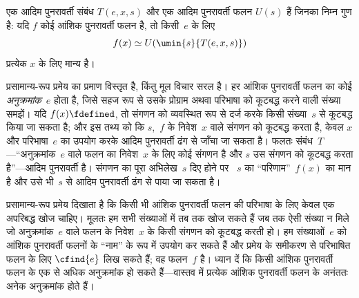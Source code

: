 \documentclass[../../../include/open-logic-section]{subfiles}
\begin{document}

\begin{thm}[क्लिनी (Kleene) का प्रसामान्य-रूप प्रमेय]
एक आदिम पुनरावर्ती संबंध $T(e, x, s)$ और एक आदिम पुनरावर्ती फलन $U(s)$
हैं जिनका निम्न गुण है: यदि $f$ कोई आंशिक पुनरावर्ती फलन है, तो किसी~$e$
के लिए
\[
f(x) \simeq U(\umin{s}{T(e, x, s)})
\]
प्रत्येक $x$ के लिए मान्य है।
\end{thm}

\begin{explain}
प्रसामान्य-रूप प्रमेय का प्रमाण विस्तृत है, किंतु मूल विचार सरल है। हर
आंशिक पुनरावर्ती फलन का कोई \emph{अनुक्रमांक}~$e$ होता है, जिसे सहज रूप
से उसके प्रोग्राम अथवा परिभाषा को कूटबद्ध करने वाली संख्या समझें। यदि
$f(x)
\fdefined$, तो संगणन को व्यवस्थित रूप से दर्ज करके किसी संख्या~$s$
से कूटबद्ध किया जा सकता है; और इस तथ्य को कि $s$,~$f$ के निवेश~$x$ वाले
संगणन को कूटबद्ध करता है, केवल $x$ और परिभाषा~$e$ का उपयोग करके आदिम
पुनरावर्ती ढंग से जाँचा जा सकता है। फलतः संबंध~$T$---``अनुक्रमांक~$e$
वाले फलन का निवेश~$x$ के लिए कोई संगणन है और $s$ उस संगणन को कूटबद्ध
करता है''---आदिम पुनरावर्ती है। संगणन का पूरा अभिलेख~$s$ दिए होने पर
~$s$ का ``परिणाम''~$f(x)$ का मान है और उसे भी~$s$ से आदिम पुनरावर्ती
ढंग से पाया जा सकता है।

प्रसामान्य-रूप प्रमेय दिखाता है कि किसी भी आंशिक पुनरावर्ती फलन की
परिभाषा के लिए केवल एक अपरिबद्ध खोज चाहिए। मूलतः हम सभी संख्याओं में तब
तक खोज सकते हैं जब तक ऐसी संख्या न मिले जो अनुक्रमांक~$e$ वाले फलन के
निवेश~$x$ के किसी संगणन को कूटबद्ध करती हो। हम संख्याओं~$e$ को आंशिक
पुनरावर्ती फलनों के ``नाम'' के रूप में उपयोग कर सकते हैं और प्रमेय के
समीकरण से परिभाषित फलन के लिए $\cfind{e}$ लिख सकते हैं; वह फलन~$f$ है। ध्यान दें कि
किसी आंशिक पुनरावर्ती फलन के एक से अधिक अनुक्रमांक हो सकते हैं---वास्तव
में प्रत्येक आंशिक पुनरावर्ती फलन के अनंततः अनेक अनुक्रमांक होते हैं।
\end{explain}
\end{document}
